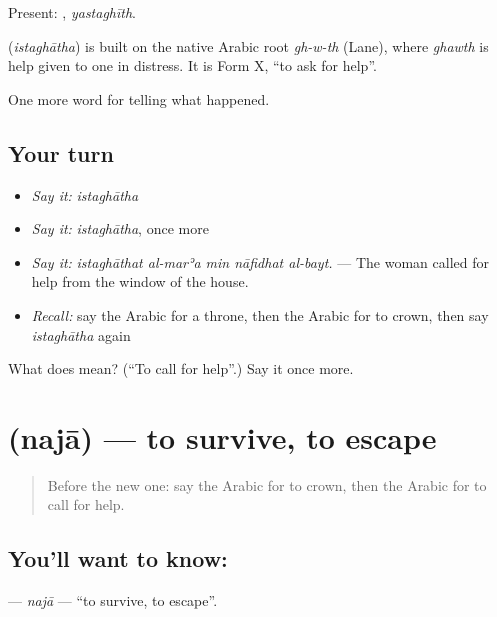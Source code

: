 Present: , \emph{yastaghīth}.

\begin{cousinweb}
\textbf{} (\emph{istaghātha}) is built on the native Arabic root \emph{gh-w-th} (Lane), where \emph{ghawth} is help given to one in distress. It is Form X, \textquotedblleft{}to ask for help\textquotedblright{}.
\end{cousinweb}

\begin{grammarlens}[title={What you've built}]
One more word for telling what happened.
\end{grammarlens}

\subsection*{Your turn}
\begin{itemize}
\raggedright
  \item \emph{Say it:} \emph{istaghātha}
  \item \emph{Say it:} \emph{istaghātha}, once more
  \item \emph{Say it:} \emph{istaghāthat al-marʾa min nāfidhat al-bayt.} — The woman called for help from the window of the house.
  \item \emph{Recall:} say the Arabic for a throne, then the Arabic for to crown, then say \emph{istaghātha} again
\end{itemize}

\begin{tcolorbox}[breakable,colback=teal!4,colframe=teal!35!black,title={Before you move on}]
What does  mean? (\textquotedblleft{}To call for help\textquotedblright{}.) Say it once more.
\end{tcolorbox}
\section[\texorpdfstring{\ar{نجا} (najā)}{نجا (najā)}]{ (najā) — to survive, to escape}

\label{lesson:AR-C310-naja}



\begin{quote}
Before the new one: say the Arabic for to crown, then the Arabic for to call for help.
\end{quote}

\subsection*{You'll want to know: }
\textbf{} — \emph{najā} — \textquotedblleft{}to survive, to escape\textquotedblright{}.

